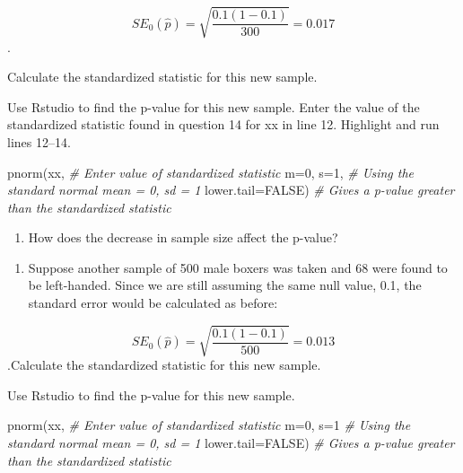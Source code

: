 \documentclass[
]{report}
\newenvironment{Shaded}{\begin{snugshade}}{\end{snugshade}}
\newcommand{\AttributeTok}[1]{\textcolor[rgb]{0.77,0.63,0.00}{#1}}
\newcommand{\CommentTok}[1]{\textcolor[rgb]{0.56,0.35,0.01}{\textit{#1}}}
\newcommand{\ConstantTok}[1]{\textcolor[rgb]{0.00,0.00,0.00}{#1}}
\newcommand{\DecValTok}[1]{\textcolor[rgb]{0.00,0.00,0.81}{#1}}
\newcommand{\FunctionTok}[1]{\textcolor[rgb]{0.00,0.00,0.00}{#1}}
\newcommand{\NormalTok}[1]{#1}
\providecommand{\tightlist}{%
  \setlength{\itemsep}{0pt}\setlength{\parskip}{0pt}}
\begin{document}
\[SE_0(\hat{p})=\sqrt{\frac{0.1(1-0.1)}{300}} = 0.017\].

Calculate the standardized statistic for this new sample.

\vspace{0.8in}

Use Rstudio to find the p-value for this new sample. Enter the value of the standardized statistic found in question 14 for xx in line 12. Highlight and run lines 12--14.

\begin{Shaded}
\begin{Highlighting}[]
\FunctionTok{pnorm}\NormalTok{(xx, }\CommentTok{\# Enter value of standardized statistic}
      \AttributeTok{m=}\DecValTok{0}\NormalTok{, }\AttributeTok{s=}\DecValTok{1}\NormalTok{, }\CommentTok{\# Using the standard normal mean = 0, sd = 1}
      \AttributeTok{lower.tail=}\ConstantTok{FALSE}\NormalTok{) }\CommentTok{\# Gives a p{-}value greater than the standardized statistic}
\end{Highlighting}
\end{Shaded}

\begin{enumerate}
\def\labelenumi{\arabic{enumi}.}
\setcounter{enumi}{16}
\tightlist
\item
  How does the decrease in sample size affect the p-value?
\end{enumerate}

\vspace{0.3in}

\begin{enumerate}
\def\labelenumi{\arabic{enumi}.}
\setcounter{enumi}{17}
\tightlist
\item
  Suppose another sample of 500 male boxers was taken and 68 were found to be left-handed. Since we are still assuming the same null value, 0.1, the standard error would be calculated as before:
\end{enumerate}

\[SE_0(\hat{p})=\sqrt{\frac{0.1(1-0.1)}{500}} = 0.013\].Calculate the standardized statistic for this new sample.

\vspace{0.8in}

Use Rstudio to find the p-value for this new sample.

\begin{Shaded}
\begin{Highlighting}[]
\FunctionTok{pnorm}\NormalTok{(xx, }\CommentTok{\# Enter value of standardized statistic}
      \AttributeTok{m=}\DecValTok{0}\NormalTok{, }\AttributeTok{s=}\DecValTok{1} \CommentTok{\# Using the standard normal mean = 0, sd = 1}
      \AttributeTok{lower.tail=}\ConstantTok{FALSE}\NormalTok{) }\CommentTok{\# Gives a p{-}value greater than the standardized statistic}
\end{Highlighting}
\end{Shaded}
\end{document}
